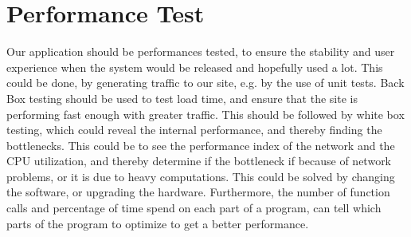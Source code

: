 \section{Performance Test}
Our application should be performances tested, to ensure the stability and user experience when the system would be released and hopefully used a lot. This could be done, by generating traffic to our site, e.g. by the use of unit tests. Back Box testing should be used to test load time, and ensure that the site is performing fast enough with greater traffic.
This should be followed by white box testing, which could reveal the internal performance, and thereby finding the bottlenecks.
This could be to see the performance index of the network and the CPU utilization, and thereby determine if the bottleneck if because of network problems, or it is due to heavy computations. This could be solved by changing the software, or upgrading the hardware.
Furthermore, the number of function calls and percentage of time spend on each part of a program, can tell which parts of the program to optimize to get a better performance. 